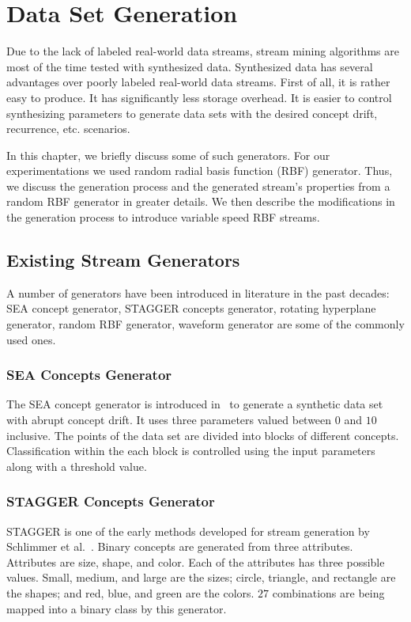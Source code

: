 \chapter{Data Set Generation}
\label{chp:dataset}
Due to the lack of labeled real-world data streams, stream mining algorithms are most of the time tested with synthesized data. Synthesized data has several advantages over poorly labeled real-world data streams. First of all, it is rather easy to produce. It has significantly less storage overhead. It is easier to control synthesizing parameters to generate data sets with the desired concept drift, recurrence, etc. scenarios.

In this chapter, we briefly discuss some of such generators. For our experimentations we used random radial basis function (RBF) generator. Thus, we  discuss the generation process and the generated stream's properties from a random RBF generator in greater details. We then describe the modifications in the generation process to introduce variable speed RBF streams.

\section{Existing Stream Generators}
A number of generators have been introduced in literature in the past decades: SEA concept generator, STAGGER concepts generator, rotating hyperplane generator, random RBF generator, waveform generator are some of the commonly used ones. 

\subsection*{SEA Concepts Generator}
The SEA concept generator is introduced in~\cite{street01:sea} to generate a synthetic data set with abrupt concept drift. It uses three parameters valued between $0$ and $10$ inclusive. The points of the data set are divided into blocks of different concepts. Classification within the each block is controlled using the input parameters along with a threshold value.

\subsection*{STAGGER Concepts Generator}
STAGGER is one of the early methods developed for stream generation by Schlimmer et al.~\cite{schlimmer86:stagger}. Binary concepts are generated from three attributes. Attributes are size, shape, and color. Each of the attributes has three possible values. Small, medium, and large are the sizes; circle, triangle, and rectangle are the shapes; and red, blue, and green are the colors. $27$ combinations are being mapped into a binary class by this generator.

